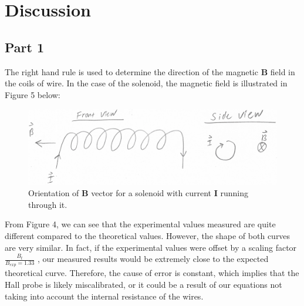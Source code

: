 \documentclass[letterpaper]{article}
\begin{document}

\section{Discussion}

\subsection{Part 1}

The right hand rule is used to determine the
direction of the magnetic $\textbf{B}$ field in the coils of wire. In the case of the
solenoid, the magnetic field is illustrated in Figure 5 below:

\begin{figure}[H]
    \centering
    \includegraphics[width=\textwidth]{question1.jpg}
    \caption{Orientation of \textbf{B} vector for a solenoid with current \textbf{I} running through it.}
\end{figure}

From Figure 4, we can see that the experimental values measured are quite different
compared to the theoretical values. However, the shape of both curves are very similar.
In fact, if the experimental values were offset by a scaling factor $\frac{B_t}{B_{exp}=1.33}$ , our
measured results would be extremely close to the expected theoretical curve. Therefore,
the cause of error is constant, which implies that the Hall probe is likely miscalibrated,
or it could be a result of our equations not taking into account the internal resistance of the wires.
\end{document}
